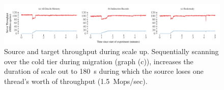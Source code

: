 \begin{figure}[t]
\centering
\includegraphics[width=1.0\textwidth]{graphs/comparison-split.pdf}
\caption{Source and target throughput during scale up. Sequentially
    scanning over the cold tier during migration (graph (c)), increases
    the duration of scale out to 180~s during which the source
    loses one thread's worth of throughput (1.5~Mops/sec).}
\label{fig:migration-split}
\end{figure}

